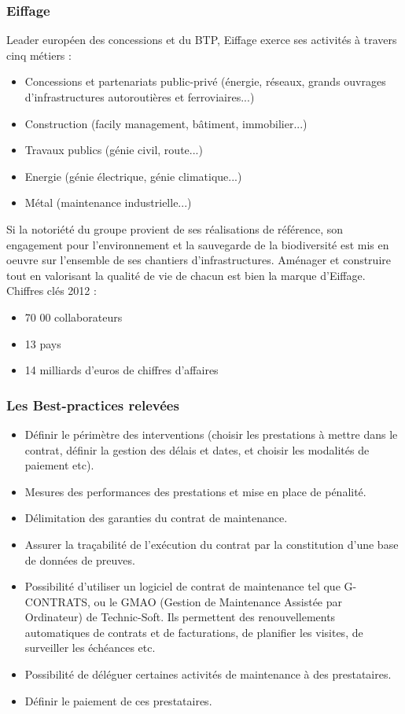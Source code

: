 \subsubsection{Eiffage}
	Leader européen des concessions et du BTP, Eiffage exerce ses activités à travers cinq métiers :
\begin{itemize}
	\item Concessions et partenariats public-privé (énergie, réseaux, grands ouvrages d'infrastructures autoroutières et ferroviaires...)
	\item Construction (facily management, bâtiment, immobilier...)
	\item Travaux publics (génie civil, route...)
	\item Energie (génie électrique, génie climatique...)
	\item Métal (maintenance industrielle...)
\end{itemize}
\bigbreak
	Si la notoriété du groupe provient de ses réalisations de référence, son engagement pour l'environnement et la sauvegarde de la biodiversité est mis en oeuvre sur l'ensemble de ses chantiers d'infrastructures. Aménager et construire tout en valorisant la qualité de vie de chacun est bien la marque d'Eiffage.
\bigbreak
Chiffres clés 2012 :
\begin{itemize}
	\item 70 00 collaborateurs
	\item 13 pays
	\item 14 milliards d'euros de chiffres d'affaires
\end{itemize}

\subsubsection{Les Best-practices relevées}
\begin{itemize}
	\item Définir le périmètre des interventions (choisir les prestations à mettre dans le contrat, définir la gestion des délais et dates, et choisir les modalités de paiement etc).
	\item Mesures des performances des prestations et mise en place de pénalité.
	\item Délimitation des garanties du contrat de maintenance.
	\item Assurer la traçabilité de l'exécution du contrat par la constitution d'une base de données de preuves.
	\item Possibilité d'utiliser un logiciel de contrat de maintenance tel que G-CONTRATS, ou le GMAO (Gestion de Maintenance Assistée par Ordinateur) de Technic-Soft. Ils permettent des renouvellements automatiques de contrats et de facturations, de planifier les visites, de surveiller les échéances etc.
	\item Possibilité de déléguer certaines activités de maintenance à des prestataires.
	\item Définir le paiement de ces prestataires.
\end{itemize}
